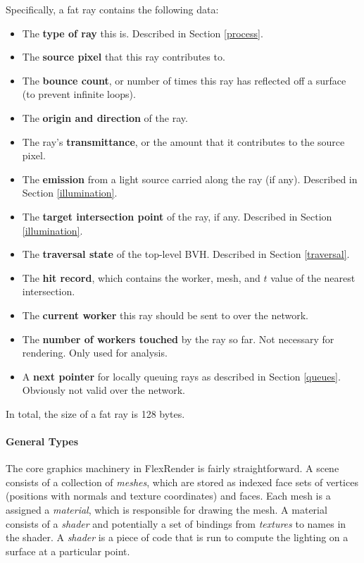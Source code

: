 \documentclass[a4paper,twoside]{article}
\begin{document}
Specifically, a fat ray contains the following data:

\begin{itemize}
    \item The \textbf{type of ray} this is. Described in Section \ref{process}.
    \item The \textbf{source pixel} that this ray contributes to.
    \item The \textbf{bounce count}, or number of times this ray has reflected
        off a surface (to prevent infinite loops).
    \item The \textbf{origin and direction} of the ray.
    \item The ray's \textbf{transmittance}, or the amount that it contributes
        to the source pixel.
    \item The \textbf{emission} from a light source carried along the ray (if
        any). Described in Section \ref{illumination}.
    \item The \textbf{target intersection point} of the ray, if any. Described
        in Section \ref{illumination}.
    \item The \textbf{traversal state} of the top-level BVH. Described in
        Section \ref{traversal}.
    \item The \textbf{hit record}, which contains the worker, mesh, and $t$
        value of the nearest intersection.
    \item The \textbf{current worker} this ray should be sent to over the
        network.
    \item The \textbf{number of workers touched} by the ray so far. Not
        necessary for rendering. Only used for analysis.
    \item A \textbf{next pointer} for locally queuing rays as described in
        Section \ref{queues}. Obviously not valid over the network.
\end{itemize}

In total, the size of a fat ray is 128 bytes.

\paragraph{General Types}
The core graphics machinery in FlexRender is fairly straightforward. A scene consists
of a collection of \emph{meshes}, which are stored as indexed face sets of vertices
(positions with normals and texture coordinates) and faces.  Each mesh is a assigned a \emph{material}, which is responsible for drawing the
mesh. A material consists of a \emph{shader} and potentially a set of bindings
from \emph{textures} to names in the shader.  A \emph{shader} is a piece of code that is run to compute the lighting on a
surface at a particular point.
\end{document}
